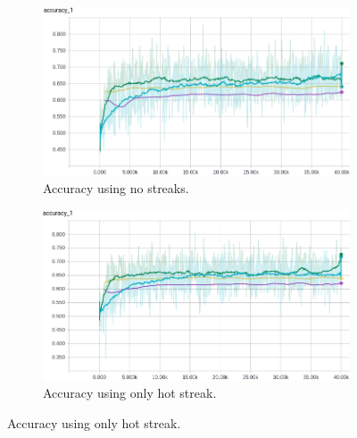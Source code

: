 \documentclass{article} %
\begin{document}
\begin{figure}[!htb]
  \begin{subfigure}{0.5\textwidth}
    \includegraphics[width=\linewidth]{plots/model1/lifetime/streak-/accuracy.png}
    \caption{Accuracy using no streaks.}\label{fig:lifetime--accuracy}
  \end{subfigure}
  \begin{subfigure}{0.5\textwidth}
    \includegraphics[width=\linewidth]{plots/model1/lifetime/streak-h/accuracy.png}
    \caption{Accuracy using only hot streak.}\label{fig:lifetime-h-accuracy}
  \end{subfigure}



\end{figure}
\end{document}
